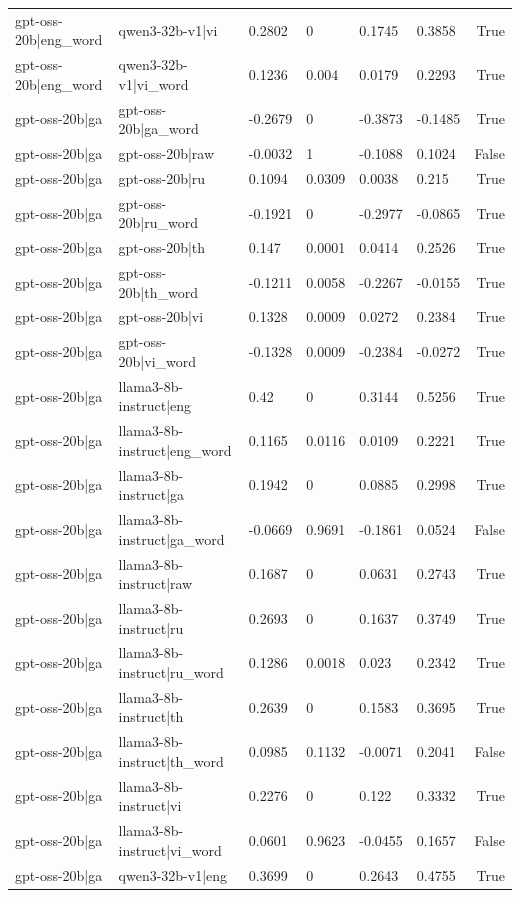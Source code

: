 \begin{table}
\begin{tabular}{llllllr}
gpt-oss-20b|eng_word & qwen3-32b-v1|vi & 0.2802 & 0 & 0.1745 & 0.3858 & True \\
gpt-oss-20b|eng_word & qwen3-32b-v1|vi_word & 0.1236 & 0.004 & 0.0179 & 0.2293 & True \\
gpt-oss-20b|ga & gpt-oss-20b|ga_word & -0.2679 & 0 & -0.3873 & -0.1485 & True \\
gpt-oss-20b|ga & gpt-oss-20b|raw & -0.0032 & 1 & -0.1088 & 0.1024 & False \\
gpt-oss-20b|ga & gpt-oss-20b|ru & 0.1094 & 0.0309 & 0.0038 & 0.215 & True \\
gpt-oss-20b|ga & gpt-oss-20b|ru_word & -0.1921 & 0 & -0.2977 & -0.0865 & True \\
gpt-oss-20b|ga & gpt-oss-20b|th & 0.147 & 0.0001 & 0.0414 & 0.2526 & True \\
gpt-oss-20b|ga & gpt-oss-20b|th_word & -0.1211 & 0.0058 & -0.2267 & -0.0155 & True \\
gpt-oss-20b|ga & gpt-oss-20b|vi & 0.1328 & 0.0009 & 0.0272 & 0.2384 & True \\
gpt-oss-20b|ga & gpt-oss-20b|vi_word & -0.1328 & 0.0009 & -0.2384 & -0.0272 & True \\
gpt-oss-20b|ga & llama3-8b-instruct|eng & 0.42 & 0 & 0.3144 & 0.5256 & True \\
gpt-oss-20b|ga & llama3-8b-instruct|eng_word & 0.1165 & 0.0116 & 0.0109 & 0.2221 & True \\
gpt-oss-20b|ga & llama3-8b-instruct|ga & 0.1942 & 0 & 0.0885 & 0.2998 & True \\
gpt-oss-20b|ga & llama3-8b-instruct|ga_word & -0.0669 & 0.9691 & -0.1861 & 0.0524 & False \\
gpt-oss-20b|ga & llama3-8b-instruct|raw & 0.1687 & 0 & 0.0631 & 0.2743 & True \\
gpt-oss-20b|ga & llama3-8b-instruct|ru & 0.2693 & 0 & 0.1637 & 0.3749 & True \\
gpt-oss-20b|ga & llama3-8b-instruct|ru_word & 0.1286 & 0.0018 & 0.023 & 0.2342 & True \\
gpt-oss-20b|ga & llama3-8b-instruct|th & 0.2639 & 0 & 0.1583 & 0.3695 & True \\
gpt-oss-20b|ga & llama3-8b-instruct|th_word & 0.0985 & 0.1132 & -0.0071 & 0.2041 & False \\
gpt-oss-20b|ga & llama3-8b-instruct|vi & 0.2276 & 0 & 0.122 & 0.3332 & True \\
gpt-oss-20b|ga & llama3-8b-instruct|vi_word & 0.0601 & 0.9623 & -0.0455 & 0.1657 & False \\
gpt-oss-20b|ga & qwen3-32b-v1|eng & 0.3699 & 0 & 0.2643 & 0.4755 & True \\

\end{tabular}
\end{table}
